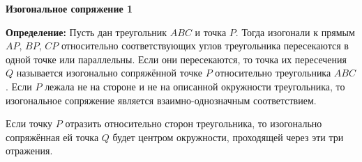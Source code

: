 \documentclass{article}
\begin{document}
    \large

    \begin{center}
        \textbf{Изогональное сопряжение 1}
    \end{center}

    \textbf{Определение:} Пусть дан треугольник $ABC$ и точка $P$.
    Тогда изогонали к прямым $AP$, $BP$, $CP$ относительно соответствующих углов треугольника пересекаются в одной точке или параллельны.
    Если они пересекаются, то точка их пересечения $Q$ называется изогонально сопряжённой точке $P$ относительно треугольника $ABC$.
    Если $P$ лежала не на стороне и не на описанной окружности треугольника, то изогональное сопряжение является взаимно-однозначным соответствием.

    Если точку $P$ отразить относительно сторон треугольника, то изогонально сопряжённая ей точка $Q$ будет центром окружности, проходящей через эти три отражения.
\end{document}
